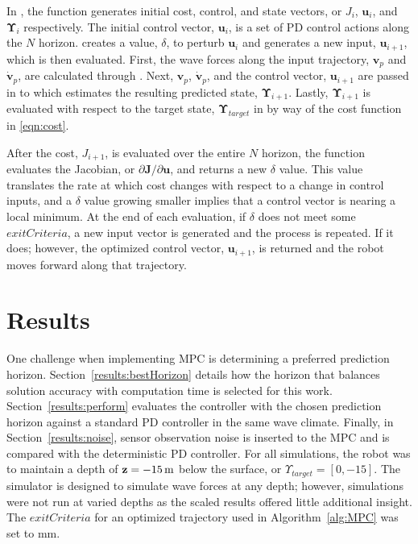 \documentclass[letterpaper, 10 pt, conferences]{IEEEconf}  %
\renewcommand{\vec}[1]{\mathbf{#1}}
\begin{document}
In , the function  generates initial cost, control, and state vectors, or $J_i$, $\vec{u}_i$, and $\vec{\Upsilon}_i$ respectively. The initial control vector, $\vec{u}_i$, is a set of PD control actions along the $N$ horizon.  creates a value, $\delta$, to perturb $\vec{u}_i$ and generates a new input, $\vec{u}_{i+1}$, which is then evaluated. First, the wave forces along the input trajectory, $\vec{v}_p$ and $\dot{\vec{v}}_p$, are calculated through . Next, $\vec{v}_p$, $\dot{\vec{v}}_p$, and the control vector, $\vec{u}_{i+1}$ are passed in to  which estimates the resulting predicted state, $\vec{\Upsilon}_{i+1}$. Lastly, $\vec{\Upsilon}_{i+1}$ is evaluated with respect to the target state, $\vec{\Upsilon}_{target}$ in  by way of the cost function in \eqref{eqn:cost}.

After the cost, $J_{i+1}$, is evaluated over the entire $N$ horizon, the function  evaluates the Jacobian, or $\partial \vec{J} / \partial \vec{u}$, and returns a new $\delta$ value. This value translates the rate at which cost changes with respect to a change in control inputs, and a $\delta$ value growing smaller implies that a control vector is nearing a local minimum. At the end of each evaluation, if $\delta$ does not meet some $exitCriteria$, a new input vector is generated and the process is repeated. If it does; however, the optimized control vector, $\vec{u}_{i+1}$, is returned and the robot moves forward along that trajectory. 

\section{Results} 
\label{sec:results}

One challenge when implementing MPC is determining a preferred prediction horizon. Section~\ref{results:bestHorizon} details how the horizon that balances solution accuracy with computation time is selected for this work. Section~\ref{results:perform} evaluates the controller with the chosen prediction horizon against a standard PD controller in the same wave climate. Finally, in Section~\ref{results:noise}, sensor observation noise is inserted to the MPC and is compared with the deterministic PD controller. For all simulations, the robot was to maintain a depth of $\vec{z} = \unit[-15]{m}$ below the surface, or $\Upsilon_{target} = [0, -15]$. The simulator is designed to simulate wave forces at any depth; however, simulations were not run at varied depths as the scaled results offered little additional insight. The $exitCriteria$ for an optimized trajectory used in Algorithm~\ref{alg:MPC} was set to \unit[5]{mm}. 
\end{document}
